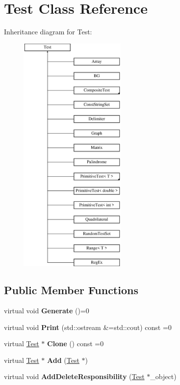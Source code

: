 \hypertarget{class_test}{}\section{Test Class Reference}
\label{class_test}
Inheritance diagram for Test\+:\begin{figure}[H]
\begin{center}
\leavevmode
\includegraphics[height=12.000000cm]{class_test}
\end{center}
\end{figure}
\subsection*{Public Member Functions}
\begin{DoxyCompactItemize}
\item 
\mbox{\label{class_test_ae733fa615b80df74a8eead13eff258bd}} 
virtual void {\bfseries Generate} ()=0
\item 
\mbox{\label{class_test_a0f822839f807872aa12de4163638f1d8}} 
virtual void {\bfseries Print} (std\+::ostream \&=std\+::cout) const =0
\item 
\mbox{\label{class_test_a859196a50bc6fb1e5153c38ecbef0ab1}} 
virtual \hyperlink{class_test}{Test} $\ast$ {\bfseries Clone} () const =0
\item 
\mbox{\label{class_test_a9dee176f10107d101a682a6b1bc60d10}} 
virtual \hyperlink{class_test}{Test} $\ast$ {\bfseries Add} (\hyperlink{class_test}{Test} $\ast$)
\item 
\mbox{\label{class_test_a6246397d122b42ed7ea3af9aa15221b2}} 
virtual void {\bfseries Add\+Delete\+Responsibility} (\hyperlink{class_test}{Test} $\ast$\+\_\+object)
\end{DoxyCompactItemize}
